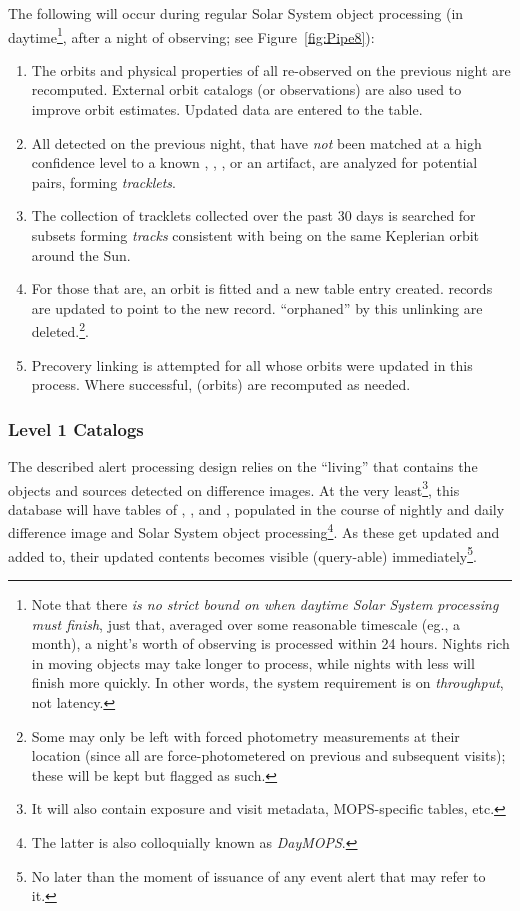The following will occur during regular Solar System object processing (in daytime\footnote{Note that there {\em is no strict bound on when daytime Solar System processing must finish}, just that, averaged over some reasonable timescale (eg., a month), a night's worth of observing is processed within 24 hours. Nights rich in moving objects may take longer to process, while nights with less will finish more quickly. In other words, the system requirement is on {\em throughput}, not latency.}, after a night of observing; see Figure~\ref{fig:Pipe8}):
\begin{enumerate}
\item The orbits and physical properties of all \SSObjects re-observed on the previous night are recomputed. External orbit catalogs (or observations) are also used to improve orbit estimates. Updated data are entered to the \SSObjects table.
\item All \DIASources detected on the previous night, that have {\em not} been matched at a high confidence level to a known \Object,
\DIAObject, \SSObject, or an artifact, are analyzed for potential pairs, forming {\em tracklets}.
\item The collection of tracklets collected over the past 30 days is searched for subsets forming {\em tracks} consistent with being on the same Keplerian orbit around the Sun.
\item For those that are, an orbit is fitted and a new \SSObject table entry created. \DIASource records are updated to point to the new \SSObject record. \DIAObjects ``orphaned'' by this unlinking are deleted.\footnote{Some \DIAObjects may only be left with forced photometry measurements at their location (since all \DIAObjects are force-photometered on previous and subsequent visits);  these will be kept but flagged as such.}.
\item Precovery linking is attempted for all \SSObjects whose orbits were updated in this process. Where successful, \SSObjects (orbits) are recomputed as needed.
\end{enumerate}


\subsubsection{Level 1 Catalogs}
\label{sec:level1db}

The described alert processing design relies on the ``living'' \DB that contains the objects and sources detected on difference images. At the very least\footnote{It will also contain exposure and visit metadata, MOPS-specific tables, etc.}, this database will have tables of \DIASources, \DIAObjects, and \SSObjects, populated in the course of nightly and daily difference image and Solar System object processing\footnote{The latter is also colloquially known as {\em DayMOPS}.}. As these get updated and added to, their updated contents becomes visible (query-able) immediately\footnote{No later than the moment of issuance of any event alert that may refer to it.}.

